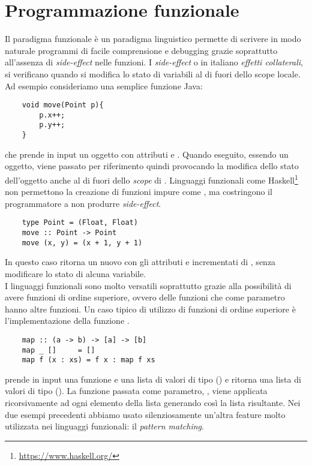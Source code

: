 \section{Programmazione funzionale}
Il paradigma funzionale è un paradigma linguistico permette di scrivere in modo naturale programmi di facile comprensione e debugging grazie soprattutto all'assenza di \emph{side-effect} nelle funzioni.
I \emph{side-effect} o in italiano \emph{effetti collaterali}, si verificano quando si modifica lo stato di variabili al di fuori dello scope locale. Ad esempio consideriamo una semplice funzione Java:
\begin{verbatim}
	void move(Point p){
		p.x++;
		p.y++;
	}
\end{verbatim} 
che prende in input un oggetto  con attributi  e . Quando eseguito, essendo  un oggetto, viene passato per riferimento
quindi provocando la modifica dello stato dell'oggetto anche al di fuori dello \textit{scope} di . Linguaggi funzionali come Haskell\footnote{\url{https://www.haskell.org/}} non
permettono la creazione di funzioni impure come , ma costringono il programmatore a non produrre \textit{side-effect}.
\begin{verbatim}
	type Point = (Float, Float)
	move :: Point -> Point
	move (x, y) = (x + 1, y + 1)
\end{verbatim}
In questo caso  ritorna un nuovo  con gli attributi  e  incrementati di , senza modificare lo stato di alcuna
variabile.
\\I linguaggi funzionali sono molto versatili soprattutto grazie alla possibilità di avere funzioni di ordine superiore, ovvero delle funzioni che come parametro
hanno altre funzioni. Un caso tipico di utilizzo di funzioni di ordine superiore è l'implementazione della funzione .
\begin{verbatim}
	map :: (a -> b) -> [a] -> [b]
	map _ []     = []
	map f (x : xs) = f x : map f xs
\end{verbatim}
 prende in input una funzione  e una lista di valori di tipo  (\code{[a]}) e ritorna una lista di valori di tipo  (\code{[b]}). La funzione passata come parametro, , viene applicata ricorsivamente ad ogni elemento della lista  generando così la lista risultante. 
Nei due esempi precedenti abbiamo usato silenziosamente un'altra feature molto utilizzata nei linguaggi funzionali: il \textit{pattern matching}.
